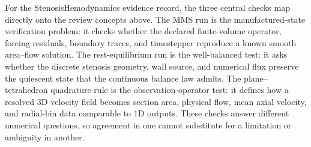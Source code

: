 \begin{stenosisillustration}
For the StenosisHemodynamics evidence record, the three central checks map
directly onto the review concepts above. The MMS run is the manufactured-state
verification problem: it checks whether the declared finite-volume operator,
forcing residuals, boundary traces, and timestepper reproduce a known smooth
area--flow solution. The rest-equilibrium run is the well-balanced test: it asks
whether the discrete stenosis geometry, wall source, and numerical flux preserve
the quiescent state that the continuous balance law admits. The
plane--tetrahedron quadrature rule is the observation-operator test: it defines
how a resolved 3D velocity field becomes section area, physical flow, mean axial
velocity, and radial-bin data comparable to 1D outputs. These checks answer
different numerical questions, so agreement in one cannot substitute for
a limitation or ambiguity in another.
\end{stenosisillustration}
